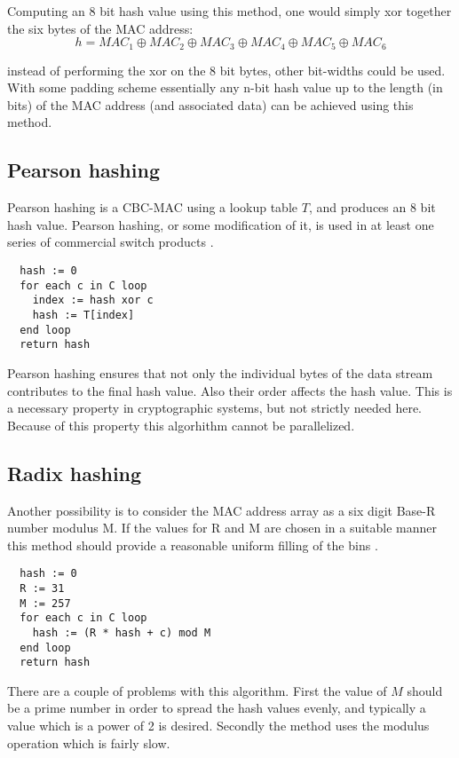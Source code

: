 Computing an 8 bit hash value using this method, one would simply xor together the six bytes of
the MAC address: 
$$h = MAC_1 \oplus MAC_2 \oplus MAC_3 \oplus MAC_4 \oplus MAC_5 \oplus MAC_6$$

instead of performing the xor on the 8 bit bytes, other bit-widths could be used. With some padding scheme 
essentially  any n-bit hash value up to the length (in bits) of the MAC address (and associated data)  can be 
achieved using this method.


\subsection{Pearson hashing}
Pearson hashing is a CBC-MAC using a lookup table $T$, and produces an 8 bit hash
value. Pearson hashing, or some modification of it, is used in at least one series of 
commercial switch products \cite{Intel2009}.
\lstset{language=C}
\begin{lstlisting}
  hash := 0
  for each c in C loop
    index := hash xor c
    hash := T[index]
  end loop
  return hash
\end{lstlisting}
Pearson hashing ensures that not only the individual bytes of the data stream contributes to 
the final hash value. Also their order affects the hash value. This is a necessary property 
in cryptographic systems, but not strictly needed here. Because of this property this 
algorhithm cannot be parallelized.

\subsection{Radix hashing}
Another possibility is to
consider the MAC address array as a six digit Base-R number modulus M.
If the values for R and M are chosen in a suitable manner this method 
should provide a reasonable uniform filling of the bins \cite{Sedgewick2011}. 


\lstset{language=C}
\begin{lstlisting}
  hash := 0
  R := 31
  M := 257
  for each c in C loop
    hash := (R * hash + c) mod M
  end loop
  return hash
\end{lstlisting}

There are a couple of problems with this algorithm. First the value of $M$ should be a prime number in 
order to spread the hash values  evenly, and typically a value which is a power of 2 is desired. Secondly
the method uses the modulus operation which is fairly slow.


